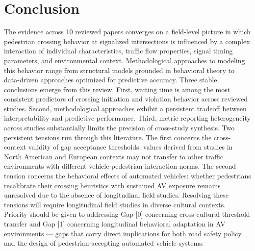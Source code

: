 \documentclass{article}
\begin{document}
\section{Conclusion}
The evidence across 10 reviewed papers converges on a field-level picture in which pedestrian crossing behavior at signalized intersections is influenced by a complex interaction of individual characteristics, traffic flow properties, signal timing parameters, and environmental context. Methodological approaches to modeling this behavior range from structural models grounded in behavioral theory to data-driven approaches optimized for predictive accuracy. Three stable conclusions emerge from this review. First, waiting time is among the most consistent predictors of crossing initiation and violation behavior across reviewed studies. Second, methodological approaches exhibit a persistent tradeoff between interpretability and predictive performance. Third, metric reporting heterogeneity across studies substantially limits the precision of cross-study synthesis. Two persistent tensions run through this literature. The first concerns the cross-context validity of gap acceptance thresholds: values derived from studies in North American and European contexts may not transfer to other traffic environments with different vehicle-pedestrian interaction norms. The second tension concerns the behavioral effects of automated vehicles: whether pedestrians recalibrate their crossing heuristics with sustained AV exposure remains unresolved due to the absence of longitudinal field studies. Resolving these tensions will require longitudinal field studies in diverse cultural contexts. Priority should be given to addressing Gap [0] concerning cross-cultural threshold transfer and Gap [1] concerning longitudinal behavioral adaptation in AV environments — gaps that carry direct implications for both road safety policy and the design of pedestrian-accepting automated vehicle systems.
\end{document}
